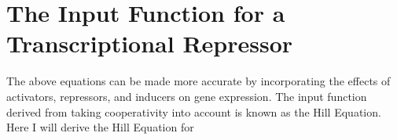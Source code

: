 \documentclass[11pt, oneside]{article}   	%
\begin{document}
\section{The Input Function for a Transcriptional Repressor}
The above equations can be made more accurate by incorporating the effects of activators, repressors, and inducers on gene expression. The input function derived from taking cooperativity into account is known as the Hill Equation. Here I will derive the Hill Equation for 
\end{document}
